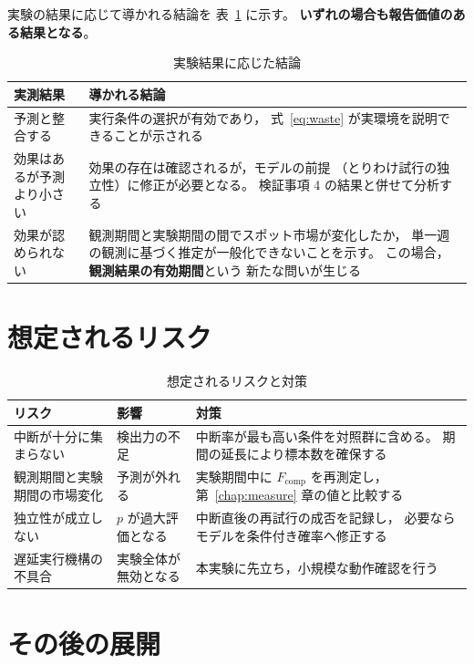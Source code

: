 \documentclass[11pt,a4paper]{ltjsreport}
\newcommand{\Fcomp}{F_{\mathrm{comp}}}
\begin{document}
実験の結果に応じて導かれる結論を
表~\ref{tab:outcomes} に示す。
\textbf{いずれの場合も報告価値のある結果となる}。

\begin{table}[htbp]
\centering
\caption{実験結果に応じた結論}
\label{tab:outcomes}
\small
\begin{tabularx}{\textwidth}{@{}lX@{}}
\toprule
実測結果 & 導かれる結論 \\
\midrule
予測と整合する
  & 実行条件の選択が有効であり，
    式~\eqref{eq:waste} が実環境を説明できることが示される \\
\addlinespace
効果はあるが予測より小さい
  & 効果の存在は確認されるが，モデルの前提
    （とりわけ試行の独立性）に修正が必要となる。
    検証事項 4 の結果と併せて分析する \\
\addlinespace
効果が認められない
  & 観測期間と実験期間の間でスポット市場が変化したか，
    単一週の観測に基づく推定が一般化できないことを示す。
    この場合，\textbf{観測結果の有効期間}という
    新たな問いが生じる \\
\bottomrule
\end{tabularx}
\end{table}

\section{想定されるリスク}

\begin{table}[htbp]
\centering
\caption{想定されるリスクと対策}
\label{tab:risks}
\small
\begin{tabularx}{\textwidth}{@{}XXX@{}}
\toprule
リスク & 影響 & 対策 \\
\midrule
中断が十分に集まらない
  & 検出力の不足
  & 中断率が最も高い条件を対照群に含める。
    期間の延長により標本数を確保する \\
\addlinespace
観測期間と実験期間の市場変化
  & 予測が外れる
  & 実験期間中に $\Fcomp$ を再測定し，
    第~\ref{chap:measure} 章の値と比較する \\
\addlinespace
独立性が成立しない
  & $p$ が過大評価となる
  & 中断直後の再試行の成否を記録し，
    必要ならモデルを条件付き確率へ修正する \\
\addlinespace
遅延実行機構の不具合
  & 実験全体が無効となる
  & 本実験に先立ち，小規模な動作確認を行う \\
\bottomrule
\end{tabularx}
\end{table}

\section{その後の展開}
\end{document}
